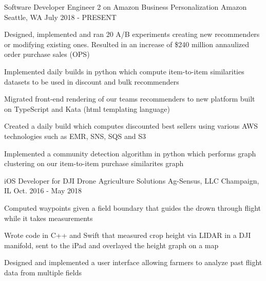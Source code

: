 

\begin{cventries}

  \cventry
    {Software Developer Engineer 2 on Amazon Business Personalization} %
    {Amazon} %
    {Seattle, WA} %
    {July 2018 - PRESENT} %
    {
      \begin{cvitems} %
        \item {Designed, implemented and ran 20 A/B experiments creating new recommenders or modifying existing ones. Resulted in an increase of \$240 million annaulized order purchase sales (OPS) }
        \item {Implemented daily builds in python which compute item-to-item similarities datasets to be used in discount and bulk recommenders}
        \item {Migrated front-end rendering of our teams recommenders to new platform built on TypeScript and Kata (html templating language)}
        \item {Created a daily build which computes discounted best sellers using various AWS technologies such as EMR, SNS, SQS and S3}
        \item {Implemented a community detection algorithm in python which performs graph clustering on our item-to-item purchase similarites graph}
      \end{cvitems}
    }

  \cventry
    {iOS Developer for DJI Drone Agriculture Solutions} %
    {Ag-Sensus, LLC} %
    {Champaign, IL} %
    {Oct. 2016 - May 2018} %
    {
      \begin{cvitems} %
        \item {Computed waypoints given a field boundary that guides the drown through flight while it takes measurements}
        \item {Wrote code in C++ and Swift that measured crop height via LIDAR in a DJI manifold, sent to the iPad and overlayed the height graph on a map}
        \item {Designed and implemented a user interface allowing farmers to analyze past flight data from multiple fields}
      \end{cvitems}
    }


\end{cventries}

